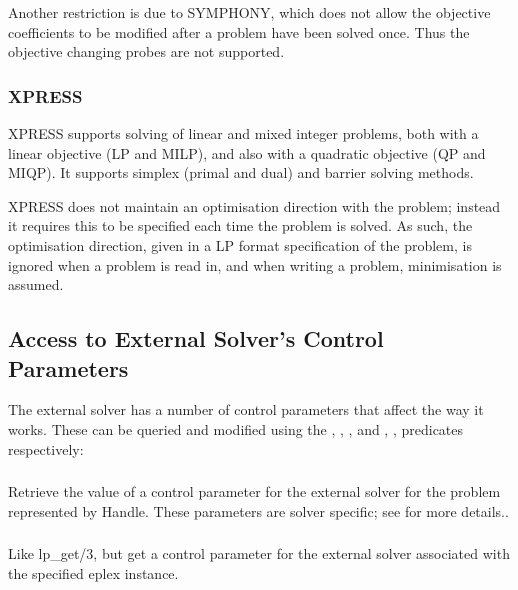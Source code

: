 Another restriction is due to SYMPHONY, which does not allow the objective
coefficients to be modified after a problem have been solved once. Thus the
objective changing probes are not supported.

\subsubsection{XPRESS}
XPRESS supports solving of linear and mixed integer problems, both with a
linear objective (LP and MILP), and also with a quadratic objective (QP and
MIQP). It supports simplex (primal and dual) and barrier solving methods.

XPRESS does not maintain an optimisation direction with the problem;
instead it requires this to be specified each time the problem is
solved. As such, the optimisation direction, given in a LP format
specification of the problem, is ignored when a problem is read in, and
when writing a problem, minimisation is assumed. 



\subsection{Access to External Solver's Control Parameters}

The external solver has a number of control
parameters that affect the way it works.
These can be queried and modified using the
,  
,
, and
, 
, 
 predicates respectively:

\subsubsection{}
Retrieve the value of a control parameter for the external solver for the
problem represented by Handle. These
parameters are solver specific; see
 for more details..

\subsubsection{}
Like lp_get/3, but get a control parameter for the external solver
associated with the specified eplex instance. 

